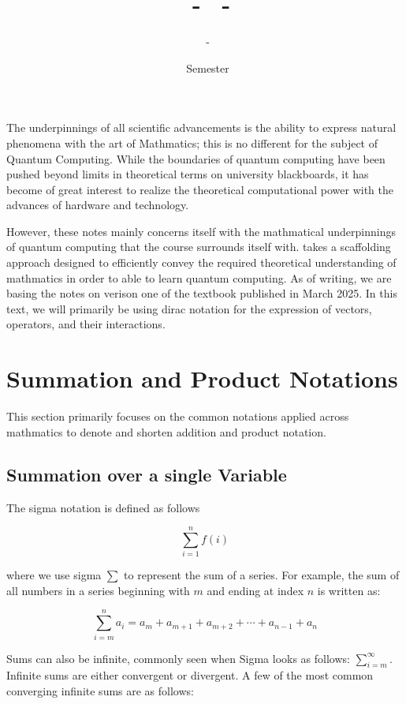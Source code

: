 \documentclass[12pt]{article}
\title{\COURSECODE\ - \FULLCOURSENAME\ - \UNIVERSITY}
\author{\PROFESSORNAME\ - \STUDENTNAME}
\date{\SEMESTER\ Semester \YEAR}
\begin{document}
\maketitle

\hfill

The underpinnings of all scientific advancements is the ability to express natural phenomena with the art of Mathmatics; this is no different for the subject of Quantum Computing. While the boundaries of quantum computing have been pushed beyond limits in theoretical terms on university blackboards, it has become of great interest to realize the theoretical computational power with the advances of hardware and technology. 

However, these notes mainly concerns itself with the mathmatical underpinnings of quantum computing that the course surrounds itself with. \FULLCOURSENAME takes a scaffolding approach designed to efficiently convey the required theoretical understanding of mathmatics in order to able to learn quantum computing. As of writing, we are basing the notes on verison one of the textbook published in March 2025. In this text, we will primarily be using dirac notation for the expression of vectors, operators, and their interactions. 

\tableofcontents

\break


\section{Summation and Product Notations}

This section primarily focuses on the common notations applied across mathmatics to denote and shorten addition and product notation. 

\subsection{Summation over a single Variable}

The sigma notation is defined as follows

$$\sum_{i=1}^{n}f(i)$$

where we use sigma $\sum$ to represent the sum of a series. For example, the sum of all numbers in a series beginning with $m$ and ending at index $n$ is written as:

$$\sum_{i=m}^{n} a_i = a_m + a_{m+1} + a_{m+2} + \cdots + a_{n-1} + a_n$$

Sums can also be infinite, commonly seen when Sigma looks as follows: $\sum^{\infty}_{i=m}$. Infinite sums are either convergent or divergent. A few of the most common converging infinite sums are as follows:
\end{document}
